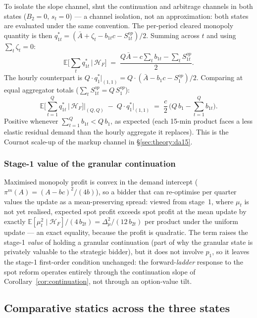 \documentclass[11pt,a4paper]{article}
\theoremstyle{definition}
\theoremstyle{remark}
\theoremstyle{plain}
\begin{document}
To isolate the slope channel, shut the continuation and arbitrage channels in both states ($B_2 = 0$, $s_t = 0$) --- a channel isolation, not an approximation: both states are evaluated under the same convention. The per-period cleared monopoly quantity is then $q_{1t}^* = (\bar A + \zeta_t - b_{1t} c - S^{op}_{1t})/2$. Summing across $t$ and using $\sum_t \zeta_t = 0$:
\[
\mathbb{E}\!\bigg[\sum_t q_{1t}^* \,\bigg|\, \mathcal{H}_F\bigg] \;=\; \frac{Q \bar A - c \sum_t b_{1t} - \sum_t S^{op}_{1t}}{2}.
\]
The hourly counterpart is $Q\cdot q_1^*|_{(1,1)} = Q\cdot(\bar A - b_1 c - S^{op}_1)/2$. Comparing at equal aggregator totals ($\sum_t S^{op}_{1t} = Q\,S^{op}_1$):
\begin{equation}
\mathbb{E}\!\bigg[\sum_{t=1}^{Q} q_{1t}^* \,\bigg|\, \mathcal{H}_F\bigg]\bigg|_{(Q,Q)} \;-\; Q\cdot q_1^*\big|_{(1,1)} \;=\; \frac{c}{2}\,\bigg(Q\, b_1 - \sum_{t=1}^{Q} b_{1t}\bigg).
\label{eq:scale-up}
\end{equation}
Positive whenever $\sum_{t=1}^{Q} b_{1t} < Q\,b_1$, as expected (each 15-min product faces a less elastic residual demand than the hourly aggregate it replaces). This is the Cournot scale-up of the markup channel in \S\ref{sec:theory:da15}.

\subsubsection{Stage-1 value of the granular continuation}\label{app:15-15:option}

Maximised monopoly profit is convex in the demand intercept ($\pi^m(A) = (A - bc)^2/(4b)$), so a bidder that can re-optimise per quarter values the update as a mean-preserving spread: viewed from stage~1, where $\mu_t$ is not yet realised, expected spot profit exceeds spot profit at the mean update by exactly $\mathbb{E}[\mu_t^2 \mid \mathcal{H}_F]/(4\, b_{2t}) = \Delta_\mu^2/(12\, b_{2t})$ per product under the uniform update --- an exact equality, because the profit is quadratic. The term raises the stage-1 \emph{value} of holding a granular continuation (part of why the granular state is privately valuable to the strategic bidder), but it does not involve $p_1$, so it leaves the stage-1 first-order condition unchanged: the forward-\emph{ladder} response to the spot reform operates entirely through the continuation slope of Corollary~\ref{cor:continuation}, not through an option-value tilt.

\subsection{Comparative statics across the three states}\label{app:comparative}
\end{document}
